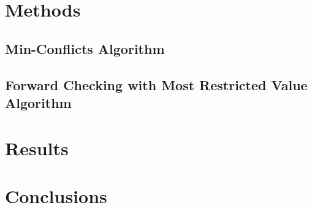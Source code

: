 \section{Methods}
\label{sec:methods}

\subsection{Min-Conflicts Algorithm}

\subsection{Forward Checking with Most Restricted Value Algorithm}

\section{Results}

\section{Conclusions}












